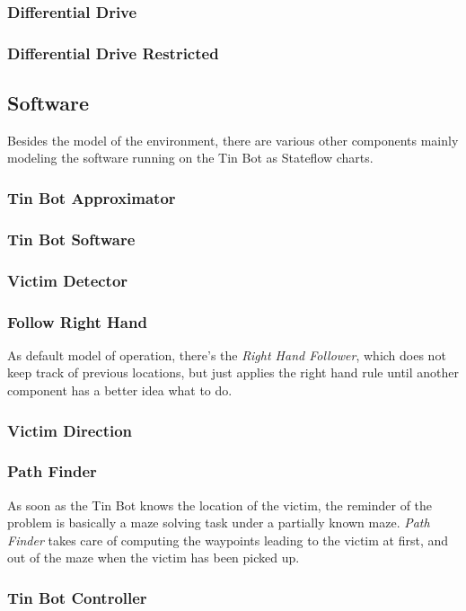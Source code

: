\documentclass[a4paper,parskip,headheight=38pt]{scrartcl} %
\begin{document}
\subsubsection{Differential Drive}
\subsubsection{Differential Drive Restricted}

\subsection{Software}
Besides the model of the environment, there are various other components mainly modeling the software running on the Tin Bot as Stateflow charts.

\subsubsection{Tin Bot Approximator}
\subsubsection{Tin Bot Software}
\subsubsection{Victim Detector}
\subsubsection{Follow Right Hand}
As default model of operation, there's the \emph{Right Hand Follower}, which does not keep track of previous locations, but just applies the right hand rule until another component has a better idea what to do.

\subsubsection{Victim Direction}
\subsubsection{Path Finder}
As soon as the Tin Bot knows the location of the victim, the reminder of the problem is basically a maze solving task under a partially known maze. 
\emph{Path Finder} takes care of computing the waypoints leading to the victim at first, and out of the maze when the victim has been picked up. 

\subsubsection{Tin Bot Controller}
\end{document}
